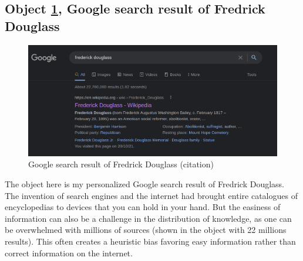 \documentclass[a4paper,11pt]{article}
\begin{document}




\subsection*{Object \ref{fig:download}, Google search result of Fredrick Douglass}

\begin{figure}[H]
 \centering
 \includegraphics[scale=0.25]{douglass.png}
 \caption{Google search result of Fredrick Douglass (citation)}
 \label{fig:download}
\end{figure}

The object here is my personalized Google search result of Fredrick Douglass. The invention of search engines and the internet had brought entire catalogues of encyclopedias to devices that you can hold in your hand. But the easiness of information can also be a challenge in the distribution of knowledge, as one can be overwhelmed with millions of sources (shown in the object with 22 millions results). This often creates a heuristic bias favoring easy information rather than correct information on the internet.
\end{document}
